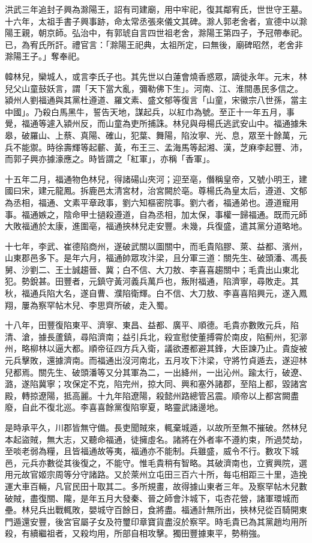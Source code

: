 洪武三年追封子興為滁陽王，詔有司建廟，用中牢祀，復其鄰宥氏，世世守王墓。十六年，太祖手書子興事跡，命太常丞張來儀文其碑。滁人郭老舍者，宣德中以滁陽王親，朝京師。弘治中，有郭琥自言四世祖老舍，滁陽王第四子，予冠帶奉祀。已，為宥氏所訐。禮官言：「滁陽王祀典，太祖所定，曰無後，廟碑昭然，老舍非滁陽王子。」奪奉祀。



韓林兒，欒城人，或言李氏子也。其先世以白蓮會燒香惑眾，謫徙永年。元末，林兒父山童鼓妖言，謂「天下當大亂，彌勒佛下生」。河南、江、淮間愚民多信之。潁州人劉福通與其黨杜遵道、羅文素、盛文郁等復言「山童，宋徽宗八世孫，當主中國」。乃殺白馬黑牛，誓告天地，謀起兵，以紅巾為號。至正十一年五月，事覺，福通等遽入潁州反，而山童為吏所捕誅。林兒與母楊氏逃武安山中。福通據朱皋，破羅山、上蔡、真陽、確山，犯葉、舞陽，陷汝寧、光、息，眾至十餘萬，元兵不能禦。時徐壽輝等起蘄、黃，布王三、孟海馬等起湘、漢，芝麻李起豐、沛，而郭子興亦據濠應之。時皆謂之「紅軍」，亦稱「香軍」。

十五年二月，福通物色林兒，得諸碭山夾河；迎至亳，僭稱皇帝，又號小明王，建國曰宋，建元龍鳳。拆鹿邑太清宮材，治宮闕於亳。尊楊氏為皇太后，遵道、文郁為丞相，福通、文素平章政事，劉六知樞密院事。劉六者，福通弟也。遵道寵用事。福通嫉之，陰命甲士撾殺遵道，自為丞相，加太保，事權一歸福通。既而元師大敗福通於太康，進圍亳，福通挾林兒走安豐。未幾，兵復盛，遣其黨分道略地。

十七年，李武、崔德陷商州，遂破武關以圖關中，而毛貴陷膠、萊、益都、濱州，山東郡邑多下。是年六月，福通帥眾攻汴梁，且分軍三道：關先生、破頭潘、馮長舅、沙劉二、王士誠趨晉、冀；白不信、大刀敖、李喜喜趨關中；毛貴出山東北犯。勢銳甚。田豐者，元鎮守黃河義兵萬戶也，叛附福通，陷濟寧，尋敗走。其秋，福通兵陷大名，遂自曹、濮陷衛輝。白不信、大刀敖、李喜喜陷興元，遂入鳳翔，屢為察罕帖木兒、李思齊所破，走入蜀。

十八年，田豐復陷東平、濟寧、東昌、益都、廣平、順德。毛貴亦數敗元兵，陷清、滄，據長蘆鎮，尋陷濟南；益引兵北，殺宣慰使董搏霄於南皮，陷薊州，犯漷州，略柳林以逼大都。順帝征四方兵入衛，議欲遷都避其鋒，大臣諫乃止。貴旋被元兵擊敗，還據濟南。而福通出沒河南北，五月攻下汴梁，守將竹貞遁去，遂迎林兒都焉。關先生、破頭潘等又分其軍為二，一出絳州，一出沁州。踰太行，破遼、潞，遂陷冀寧；攻保定不克，陷完州，掠大同、興和塞外諸郡，至陷上都，毀諸宮殿，轉掠遼陽，抵高麗。十九年陷遼陽，殺懿州路總管呂震。順帝以上都宮闕盡廢，自此不復北巡。李喜喜餘黨復陷寧夏，略靈武諸邊地。

是時承平久，川郡皆無守備。長吏聞賊來，輒棄城遁，以故所至無不摧破。然林兒本起盜賊，無大志，又聽命福通，徒擁虛名。諸將在外者率不遵約束，所過焚劫，至啖老弱為糧，且皆福通故等夷，福通亦不能制。兵雖盛，威令不行。數攻下城邑，元兵亦數從其後復之，不能守。惟毛貴稍有智略。其破濟南也，立賓興院，選用元故官姬宗周等分守諸路。又於萊州立屯田三百六十所，每屯相距三十里，造挽運大車百輛，凡官民田十取其二。多所規畫，故得據山東者三年。及察罕帖木兒數破賊，盡復關、隴，是年五月大發秦、晉之師會汴城下，屯杏花營，諸軍環城而壘。林兒兵出戰輒敗，嬰城守百餘日，食將盡。福通計無所出，挾林兒從百騎開東門遁還安豐，後宮官屬子女及符璽印章寶貨盡沒於察罕。時毛貴已為其黨趙均用所殺，有續繼祖者，又殺均用，所部自相攻擊。獨田豐據東平，勢稍強。

